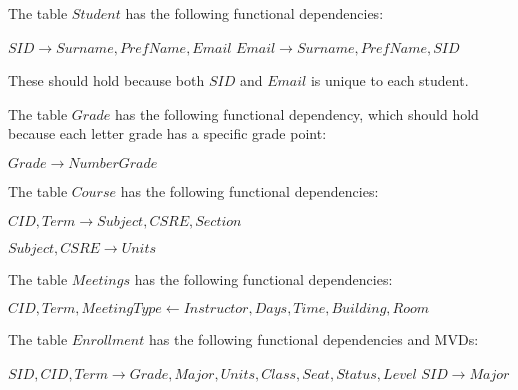 
The table $Student$ has the following functional dependencies:

$SID \rightarrow Surname, PrefName, Email$
$Email \rightarrow Surname, PrefName, SID$

These should hold because both $SID$ and $Email$ is unique to each student.

The table $Grade$ has the following functional dependency, which should hold because each letter grade has a specific grade point:

$Grade \rightarrow NumberGrade$

The table $Course$ has the following functional dependencies:

$CID, Term \rightarrow Subject, CSRE, Section$

$Subject, CSRE \rightarrow Units$

The table $Meetings$ has the following functional dependencies:

$CID, Term, Meeting Type \leftarrow Instructor, Days, Time, Building, Room$

The table $Enrollment$ has the following functional dependencies and MVDs:

$SID, CID, Term \rightarrow Grade, Major, Units, Class, Seat, Status, Level$
$SID \rightarrow Major$